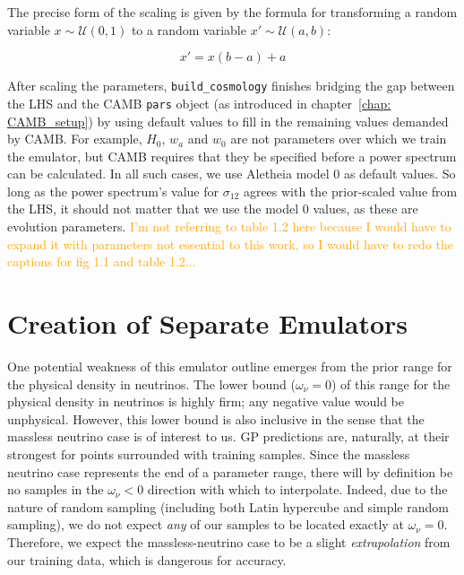 The precise form of the scaling is given by the formula for transforming a
random variable $x \sim \mathcal{U}(0, 1)$ to a random variable
$x' \sim \mathcal{U}(a, b)$:

\begin{equation}
\label{eq: scaling}
x' = x (b - a) + a
\end{equation}

After scaling the parameters, \verb|build_cosmology| finishes bridging the gap
between the LHS and the CAMB \verb|pars| object (as introduced in
chapter~\ref{chap: CAMB_setup}) by using default values to fill in the
remaining values demanded by CAMB. For example, $H_0$, $w_a$ and $w_0$ are
not parameters over which we train the emulator, but CAMB requires that they 
be specified before a power spectrum can be calculated. In all such cases, we 
use Aletheia model 0 as default values. So long as the power spectrum's value 
for $\sigma_{12}$ agrees with the prior-scaled value from the LHS, it should 
not matter that we use the model 0 values, as these are evolution parameters.
\textcolor{orange}{I'm not referring to table 1.2 here
because I would have to expand it with parameters not essential to this work,
so I would have to redo the captions for fig 1.1 and table 1.2...}


\section{Creation of Separate Emulators}
\label{sec: 2emu_intro}

One potential weakness of this emulator outline emerges 
from the prior range for the physical density in neutrinos. The lower bound 
($\omega_\nu = 0$) of this range for the physical density in neutrinos is 
highly firm; any negative value would be unphysical. However, this 
lower bound is also inclusive in the sense that the massless neutrino case is  
of interest to us. GP predictions are, naturally, at their 
strongest for points surrounded with training samples. Since the massless 
neutrino case represents the end of a parameter range, there will by 
definition be no samples in the $\omega_\nu < 0$ direction with which to
interpolate. Indeed, due to the nature of random sampling (including both 
Latin hypercube and simple random sampling), we do not expect \textit{any}
of our
samples to be located exactly at $\omega_\nu = 0$.
Therefore, we expect the massless-neutrino case to be a slight
\textit{extrapolation} from our training data, which is dangerous for 
accuracy.

